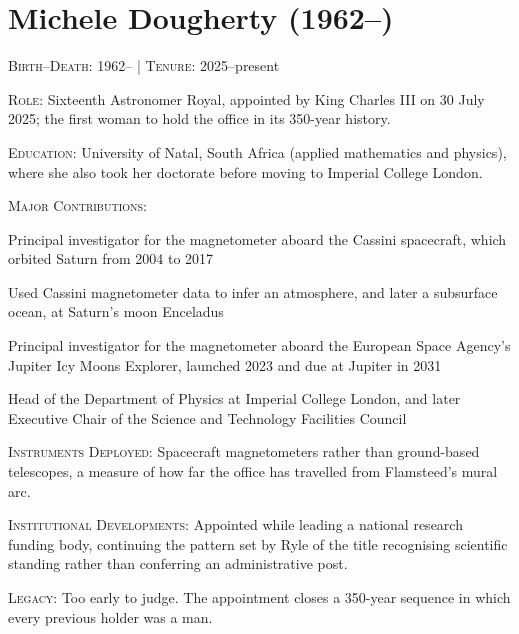 \medskip

\section*{Michele Dougherty (1962--)}
\textsc{Birth--Death}: 1962-- | \textsc{Tenure}: 2025--present

\noindent\textsc{Role}: Sixteenth Astronomer Royal, appointed by King Charles III on 30 July 2025; the first woman to hold the office in its 350-year history.

\noindent\textsc{Education}: University of Natal, South Africa (applied mathematics and physics), where she also took her doctorate before moving to Imperial College London.

\noindent\textsc{Major Contributions}:
\begin{enumerate*}[label=(\arabic*)]
\item Principal investigator for the magnetometer aboard the Cassini spacecraft, which orbited Saturn from 2004 to 2017
\item Used Cassini magnetometer data to infer an atmosphere, and later a subsurface ocean, at Saturn's moon Enceladus
\item Principal investigator for the magnetometer aboard the European Space Agency's Jupiter Icy Moons Explorer, launched 2023 and due at Jupiter in 2031
\item Head of the Department of Physics at Imperial College London, and later Executive Chair of the Science and Technology Facilities Council
\end{enumerate*}

\noindent\textsc{Instruments Deployed}: Spacecraft magnetometers rather than ground-based telescopes, a measure of how far the office has travelled from Flamsteed's mural arc.

\noindent\textsc{Institutional Developments}: Appointed while leading a national research funding body, continuing the pattern set by Ryle of the title recognising scientific standing rather than conferring an administrative post.

\noindent\textsc{Legacy}: Too early to judge. The appointment closes a 350-year sequence in which every previous holder was a man.
